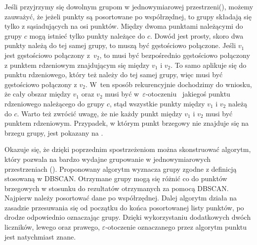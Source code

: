 

Jeśli przyjrzymy się dowolnym grupom w jednowymiarowej przestrzeni\linebreak (), możemy zauważyć, że jeżeli punkty są posortowane po współrzędnej, to grupy składają się tylko z sąsiadujących na osi punktów. Między dwoma punktami należącymi do grupy $ c $ mogą istnieć tylko punkty należące do $ c $. Dowód jest prosty, skoro dwa punkty należą do tej samej grupy, to muszą być gęstościowo połączone. Jeśli $ v_1 $ jest gęstościowo połączony \mbox{z $ v_2 $}, to musi być bezpośrednio gęstościowo połączony z punktem rdzeniowym znajdującym się między $ v_1 $ i $ v_2 $. To samo aplikuje się do punktu rdzeniowego, który też należy do tej samej grupy, więc musi być gęstościowo połączony z $ v_2 $. \mbox{W ten} sposób rekurencyjnie dochodzimy do wniosku, że cały obszar między $ v_1 $ oraz $ v_2 $ musi być \mbox{w $ \varepsilon $-otoczeniu } jakiegoś punktu rdzeniowego należącego do grupy $ c $, stąd wszystkie punkty między $ v_1 $ i $ v_2 $ należą do $ c $. Warto też zwrócić uwagę, że nie każdy punkt między $ v_1 $ i $ v_2 $ musi być punktem rdzeniowym. Przypadek, w którym punkt brzegowy nie znajduje się na brzegu grupy, jest pokazany na .\par
Okazuje się, że dzięki poprzednim spostrzeżeniom można skonstruować algorytm, który pozwala na bardzo wydajne grupowanie w jednowymiarowych przestrzeniach (). Proponowany algorytm wyznacza grupy zgodne z definicją stosowaną w DBSCAN. Otrzymane grupy mogą się różnić co do punktów brzegowych w stosunku do rezultatów otrzymanych za pomocą DBSCAN. Najpierw należy posortować dane po współrzędnej. Dalej algorytm działa na zasadzie przesuwania się od początku do końca posortowanej listy punktów, po drodze odpowiednio oznaczając grupy. Dzięki wykorzystaniu dodatkowych dwóch liczników, lewego oraz prawego, $ \varepsilon $-otoczenie oznaczanego przez algorytm punktu jest natychmiast znane.\par



